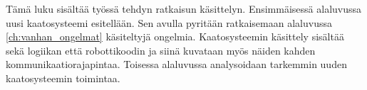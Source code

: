 Tämä luku sisältää työssä tehdyn ratkaisun käsittelyn. Ensimmäisessä alaluvussa uusi kaatosysteemi esitellään. Sen avulla pyritään ratkaisemaan alaluvussa \ref{ch:vanhan_ongelmat} käsiteltyjä ongelmia. Kaatosysteemin käsittely sisältää sekä logiikan että robottikoodin ja siinä kuvataan myös näiden kahden kommunikaatiorajapintaa. Toisessa alaluvussa analysoidaan tarkemmin uuden kaatosysteemin toimintaa.
